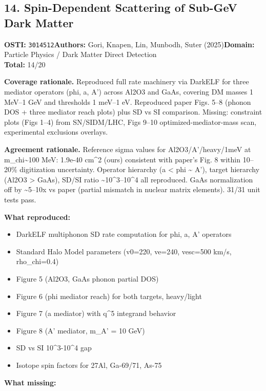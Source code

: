 \subsection{14. Spin-Dependent Scattering of Sub-GeV Dark Matter}
\textbf{OSTI:} \texttt{3014512}\quad\textbf{Authors:} Gori, Knapen, Lin, Munbodh, Suter (2025)\quad\textbf{Domain:} Particle Physics / Dark Matter Direct Detection\\
\quad{}\quad\textbf{Total:} 14/20\par\smallskip
\noindent\textbf{Coverage rationale.} Reproduced full rate machinery via DarkELF for three mediator operators (phi, a, A') across Al2O3 and GaAs, covering DM masses 1 MeV--1 GeV and thresholds 1 meV--1 eV. Reproduced paper Figs. 5--8 (phonon DOS + three mediator reach plots) plus SD vs SI comparison. Missing: constraint plots (Figs 1--4) from SN/SIDM/LHC, Figs 9--10 optimized-mediator-mass scan, experimental exclusions overlays.\par
\noindent\textbf{Agreement rationale.} Reference sigma values for Al2O3/A'/heavy/1meV at m\_chi\textasciitilde{}100 MeV: 1.9e-40 cm\textasciicircum{}2 (ours) consistent with paper's Fig. 8 within 10--20\% digitization uncertainty. Operator hierarchy (a \textless{} phi \textasciitilde{} A'), target hierarchy (Al2O3 \textgreater{} GaAs), SD/SI ratio \textasciitilde{}10\textasciicircum{}3--10\textasciicircum{}4 all reproduced. GaAs normalization off by \textasciitilde{}5--10x vs paper (partial mismatch in nuclear matrix elements). 31/31 unit tests pass.\par\smallskip
\noindent\textbf{What reproduced:}
\begin{itemize}[leftmargin=1.4em,itemsep=0.2em,topsep=0.2em]
\item DarkELF multiphonon SD rate computation for phi, a, A' operators
\item Standard Halo Model parameters (v0=220, ve=240, vesc=500 km/s, rho\_chi=0.4)
\item Figure 5 (Al2O3, GaAs phonon partial DOS)
\item Figure 6 (phi mediator reach) for both targets, heavy/light
\item Figure 7 (a mediator) with q\textasciicircum{}5 integrand behavior
\item Figure 8 (A' mediator, m\_A' = 10 GeV)
\item SD vs SI 10\textasciicircum{}3-10\textasciicircum{}4 gap
\item Isotope spin factors for 27Al, Ga-69/71, As-75
\end{itemize}\noindent\textbf{What missing:}

